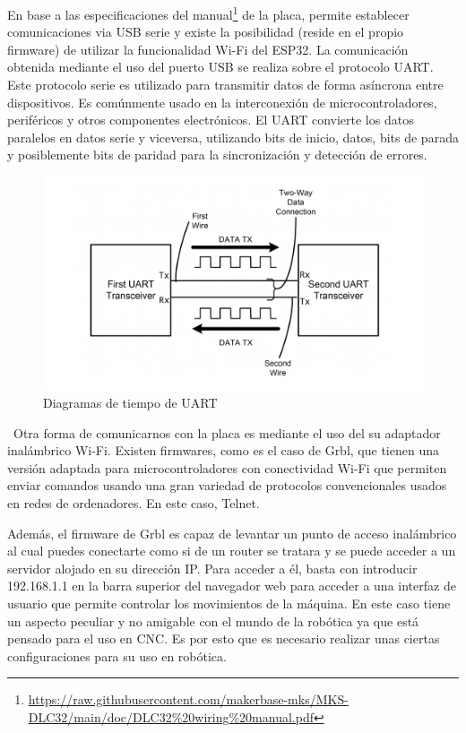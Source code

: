En base a las especificaciones del manual\footnote{\url{https://raw.githubusercontent.com/makerbase-mks/MKS-DLC32/main/doc/DLC32\%20wiring\%20manual.pdf}} 
de la placa, permite establecer comunicaciones via USB serie y existe la posibilidad (reside en el propio firmware) de utilizar la funcionalidad 
Wi-Fi del ESP32. 
La comunicación obtenida mediante el uso del puerto USB se realiza sobre el protocolo \ac{UART}. Este protocolo serie es utilizado para 
transmitir datos de forma asíncrona entre dispositivos. Es comúnmente usado en la interconexión de microcontroladores, 
periféricos y otros componentes electrónicos. El UART convierte los datos paralelos en datos serie y viceversa, utilizando bits 
de inicio, datos, bits de parada y posiblemente bits de paridad para la sincronización y detección de errores. 
\begin{figure} [h!]
    \begin{center}
    \includegraphics[width=12cm]{figs/uart.png}
    \end{center}
    \caption{Diagramas de tiempo de UART}
    \label{fig:uart}
\end{figure}\ 
Otra forma de comunicarnos con la placa es mediante el uso del su adaptador inalámbrico Wi-Fi. Existen firmwares, como es el caso de 
Grbl, que tienen una versión adaptada para microcontroladores con conectividad Wi-Fi que permiten enviar comandos usando una gran 
variedad de protocolos convencionales usados en redes de ordenadores. En este caso, Telnet. 

Además, el firmware de Grbl es capaz de levantar un punto de acceso inalámbrico al cual puedes conectarte como si de un router 
se tratara y se puede acceder a un servidor alojado en su dirección IP. Para acceder a él, basta con introducir 192.168.1.1 en la 
barra superior del navegador web para acceder a una interfaz de usuario que permite controlar los movimientos de la máquina. En este 
caso tiene un aspecto peculiar y no amigable con el mundo de la robótica ya que está pensado para el uso en CNC. Es por esto que es 
necesario realizar unas ciertas configuraciones para su uso en robótica.

